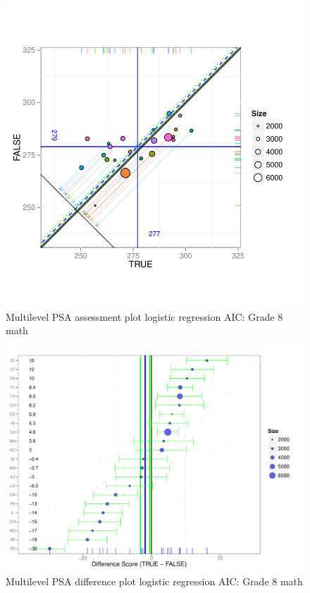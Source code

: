 \begin{figure}[h!]
\begin{center}
\includegraphics[width=\textwidth]{../Figures2009/g8math-mlpsa-lrAIC-circ.pdf}
\caption{Multilevel PSA assessment plot logistic regression AIC: Grade 8 math}
\end{center}
\end{figure}

\begin{figure}[h!]
\begin{center}
\includegraphics[width=\textwidth]{../Figures2009/g8math-mlpsa-lrAIC-diff.pdf}
\caption{Multilevel PSA difference plot logistic regression AIC: Grade 8 math}
\end{center}
\end{figure}

